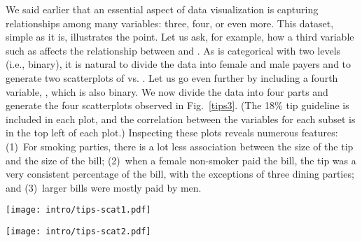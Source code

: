  We said earlier that an essential
aspect of data visualization is capturing relationships among many
variables: three, four, or even more.  This dataset, simple as it is,
illustrates the point.  Let us ask, for example, how a third variable
such as  affects the relationship between  and
.  As  is categorical with two levels (i.e.,
binary), it is natural to divide the data into female and male payers
and to generate two scatterplots of  vs. .  Let us
go even further by including a fourth variable, , which
is also binary.  We now divide the data into four parts and generate
the four scatterplots observed in Fig.~\ref{tips3}. (The 18\% tip
guideline is included in each plot, and the correlation between the
variables for each subset is in the top left of each plot.) Inspecting
these plots reveals numerous features: (1)~For smoking parties, there
is a lot less association between the size of the tip and the size of
the bill; (2)~when a female non-smoker paid the bill, the tip was a
very consistent percentage of the bill, with the exceptions of three
dining parties; and (3)~larger bills were mostly paid by men.

\begin{figure*}[htp]
\centerline{\texttt{[image: intro/tips-scat1.pdf]}}%
\caption[Scatterplot of  vs. ]{Scatterplot of
 vs. . The line represents a tip of 18\%. 
The greater number of points far below the line indicates that there
are more ``cheap tippers'' than generous tippers.}
\label{tips2}
\end{figure*}

\begin{figure*}[htp]
\centerline{\texttt{[image: intro/tips-scat2.pdf]}}
\caption[Scatterplot of  vs.  conditioned by
 and ]{Scatterplot of  vs. 
conditioned by  and . There is almost no
association between  and  in the smoking parties,
and with the exception of three dining parties, when a female
non-smoker paid the bill, the tip was extremely consistent.}
\label{tips3}
\end{figure*}

